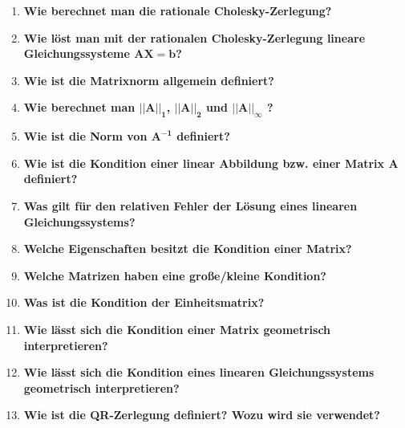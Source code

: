 \begin{enumerate}
		\item \textbf{Wie berechnet man die rationale Cholesky-Zerlegung?} \\
		
		\item \textbf{Wie löst man mit der rationalen Cholesky-Zerlegung lineare Gleichungssysteme \(\mathbf{AX=b}\)?} \\
		
		\item \textbf{Wie ist die Matrixnorm allgemein definiert?} \\
		
		\item \textbf{Wie berechnet man \(\mathbf{||\text{A}||_1}\), \(\mathbf{||\text{A}||_2}\) und \(\mathbf{||\text{A}||_\infty}\) ?} \\
		
		\item \textbf{Wie ist die Norm von \(\mathbf{A^{-1}}\) definiert?} \\
		
		\item \textbf{Wie ist die Kondition einer linear Abbildung bzw. einer Matrix A definiert?} \\
		
		\item \textbf{Was gilt für den relativen Fehler der Lösung eines linearen Gleichungssystems?} \\
		
		\item \textbf{Welche Eigenschaften besitzt die Kondition einer Matrix?} \\
		
		\item \textbf{Welche Matrizen haben eine große/kleine Kondition?} \\
		
		\item \textbf{Was ist die Kondition der Einheitsmatrix?} \\
		
		\item \textbf{Wie lässt sich die Kondition einer Matrix geometrisch interpretieren?} \\
		
		\item \textbf{Wie lässt sich die Kondition eines linearen Gleichungssystems geometrisch interpretieren?} \\
		
		\item \textbf{Wie ist die QR-Zerlegung definiert? Wozu wird sie verwendet?} \\
		
	\end{enumerate}